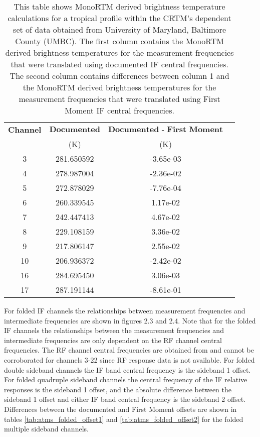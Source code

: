 \begin{table}[htp]
  \centering
  \begin{tabular}{|c|c|c|c|}
    \hline
    \textbf{Channel} & $\textbf{Documented}$ & $\textbf{Documented - First Moment} $  \\
    & (K) & (K) \\               
    \hline\hline 
    3   &  281.650592  &  -3.65e-03 \\  
    4   &  278.987004  &  -2.36e-02 \\  
    5   &  272.878029  &  -7.76e-04 \\ 
    6   &  260.339545  &   1.17e-02 \\
    7   &  242.447413  &   4.67e-02 \\ 
    8   &  229.108159  &   3.36e-02 \\ 
    9   &  217.806147  &   2.55e-02 \\ 
    10  &  206.936372  &  -2.42e-02 \\ 
    16  &  284.695450  &   3.06e-03 \\ 
    17  &  287.191144  &  -8.61e-01 \\
    \hline
  \end{tabular}
  \caption{This table shows MonoRTM derived brightness temperature calculations for a tropical profile within the CRTM's dependent set of data obtained from University of Maryland, Baltimore County (UMBC). The first column contains the MonoRTM derived brightness temperatures for the measurement frequencies that were translated using documented IF central frequencies.  The second column contains differences between column 1 and
   the MonoRTM derived brightness temperatures for the measurement frequencies that were translated using First Moment IF central frequencies.}
  \label{tab:radiometric_impact}
\end{table}

For folded IF channels the relationships between measurement frequencies and intermediate frequencies are shown in
figures 2.3 and 2.4. Note that for the folded IF channels the relationships between the measurement frequencies and intermediate frequencies are only dependent on the RF channel central frequencies. The RF channel central frequencies are obtained from \cite{CrIS_EDR_ATBD} and cannot be corroborated for channels 3-22 since RF response data is not available. For folded double sideband channels the IF band central frequency is the sideband 1 offset. For folded quadruple sideband channels the central frequency of the IF relative responses is the sideband 1 offset, and the absolute difference between the sideband 1 offset and either IF band central frequency is the sideband 2 offset. Differences between the documented and First Moment offsets are shown in tables \ref{tab:atms_folded_offset1} and \ref{tab:atms_folded_offset2} for the folded multiple sideband channels. 


